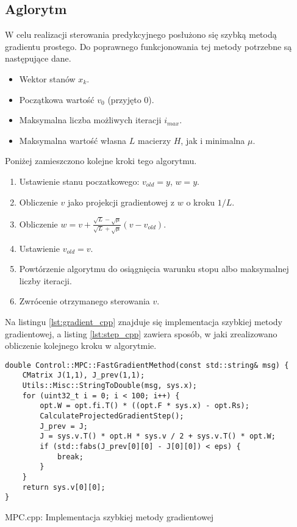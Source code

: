 \subsection{Aglorytm} \label{sec:algorithm}
W celu realizacji sterowania predykcyjnego posłużono się szybką metodą gradientu prostego. %
Do poprawnego funkcjonowania tej metody potrzebne są następujące dane.
\begin{itemize}
    \item Wektor stanów $x_k$.
    \item Początkowa wartość $v_0$ (przyjęto 0).
    \item Maksymalna liczba możliwych iteracji $i_{max}$.
    \item Maksymalna wartość własna $L$ macierzy $H$, jak i minimalna $\mu$. 
\end{itemize}
Poniżej zamieszczono kolejne kroki tego algorytmu.
\begin{enumerate}
    \item Ustawienie stanu poczatkowego: $v_{old} = y$, $w = y$.
    \item Obliczenie $v$ jako projekcji gradientowej z $w$ o kroku $1/L$.
    \item Obliczenie $w = v + \frac{\sqrt{L} - \sqrt{\mu}}{\sqrt{L} + \sqrt{\mu}}(v - v_{old})$.
    \item Ustawienie $v_{old} = v$.
    \item Powtórzenie algorytmu do osiągnięcia warunku stopu albo maksymalnej liczby iteracji.
    \item Zwrócenie otrzymanego sterowania $v$.  
\end{enumerate}
Na listingu \ref{lst:gradient_cpp} znajduje się implementacja szybkiej metody gradientowej, a
listing \ref{lst:step_cpp} zawiera sposób, w jaki zrealizowano obliczenie kolejnego kroku w algorytmie.
\begin{listing}[htb]
\begin{verbatim}
double Control::MPC::FastGradientMethod(const std::string& msg) {
    CMatrix J(1,1), J_prev(1,1);
    Utils::Misc::StringToDouble(msg, sys.x);
    for (uint32_t i = 0; i < 100; i++) {
        opt.W = opt.fi.T() * ((opt.F * sys.x) - opt.Rs);
        CalculateProjectedGradientStep();
        J_prev = J;
        J = sys.v.T() * opt.H * sys.v / 2 + sys.v.T() * opt.W;
        if (std::fabs(J_prev[0][0] - J[0][0]) < eps) {
            break;
        }
    }
    return sys.v[0][0];
}
\end{verbatim}
\caption{MPC.cpp: Implementacja szybkiej metody gradientowej}
\label{lst:gradient_cpp}
\end{listing}

